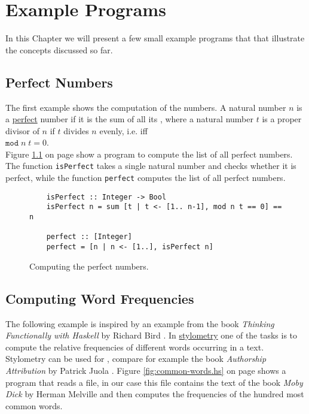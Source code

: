 \chapter{Example Programs}
In this Chapter we will present a few small example programs that that illustrate the concepts discussed so far.

\section{Perfect Numbers}
The first example shows the computation of the  numbers.  A natural number $n$ is a
\href{https://en.wikipedia.org/wiki/Perfect_number}{perfect} number if it is the sum of all its ,
where a natural number $t$ is a proper divisor of $n$ if $t$ divides $n$ evenly, i.e. iff
\\[0.2cm]
\hspace*{1.3cm}
$\texttt{mod}\; n\; t = 0$.
\\[0.2cm]
Figure \ref{fig:perfect.hs} on page \pageref{fig:perfect.hs} show a program to compute the list of all perfect
numbers.  The function \texttt{isPerfect} takes a single natural number and checks whether it is perfect, while
the function \texttt{perfect} computes the list of all perfect numbers.

\begin{figure}[!ht]
\centering
\begin{verbatim}
    isPerfect :: Integer -> Bool
    isPerfect n = sum [t | t <- [1.. n-1], mod n t == 0] == n
    
    perfect :: [Integer]
    perfect = [n | n <- [1..], isPerfect n]
\end{verbatim}
\vspace*{-0.3cm}
\caption{Computing the perfect numbers.}
\label{fig:perfect.hs}
\end{figure}

\section{Computing Word Frequencies}
The following example is inspired by an example from the book
\emph{Thinking Functionally with Haskell} by Richard Bird \cite{bird:2014}.
In \href{https://en.wikipedia.org/wiki/stylometry}{stylometry} one of the tasks is to compute the
relative frequencies of different words occurring in a text.  Stylometry can be used for
, compare for example the book \emph{Authorship Attribution} by Patrick
Juola \cite{juola:2008}.  Figure \ref{fig:common-words.hs} on page \pageref{fig:common-words.hs}
shows a program that reads a file, in our case this file contains the text of the book \emph{Moby Dick}
by Herman Melville \cite{melville:1851} and then computes the frequencies of the hundred most common words.


